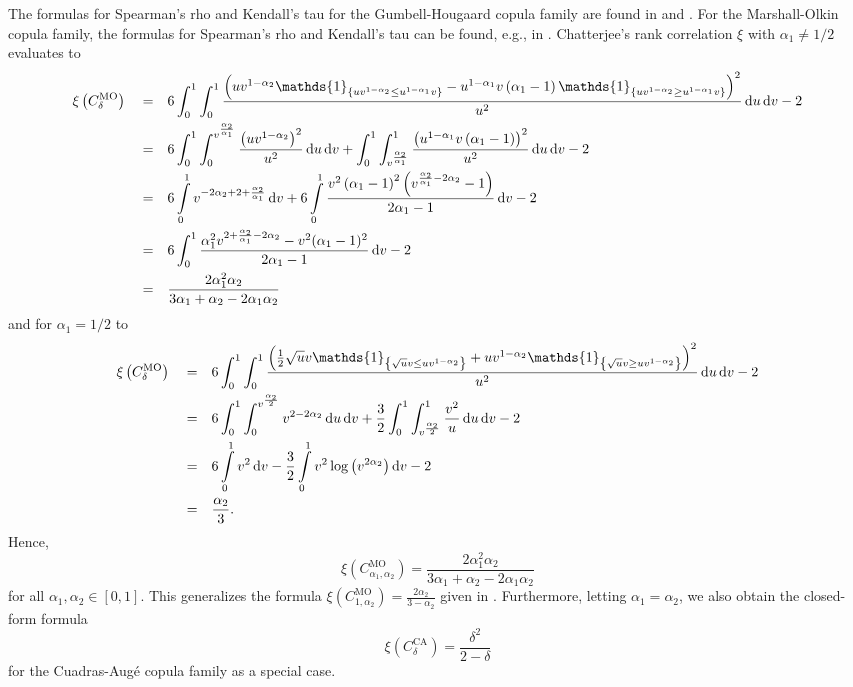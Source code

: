 \documentclass{article}
\def\1{\mathds{1}} %
\def\of#1{\left(#1\right)} %
\def\setof#1{\left\{#1\right\}} %
\newcommand{\de}{\mathrm{\,d}}
\begin{document}
The formulas for Spearman's rho and Kendall's tau for the Gumbell-Hougaard copula family are found in \cite[Example 4.2]{hurlimann2004properties} and \cite[Example 5.4]{Nelsen-2006}.
For the Marshall-Olkin copula family, the formulas for Spearman's rho and Kendall's tau can be found, e.g., in \cite[Example 5.7 a), Example 5.9 c)]{Nelsen-2006}.
Chatterjee's rank correlation $\xi$ with $\alpha_1 \neq 1/2$ evaluates to
\begin{align*}
    \xi\of{C^{\text{MO}}_{\delta}}
    \quad = \quad & 6 \int_0^1\int_0^1 \frac{\left(u v^{1 - \alpha_{2}} \1_{\setof{u v^{1 - \alpha_{2}} \leq u^{1 - \alpha_{1}} v}} - u^{1 - \alpha_{1}} v \left(\alpha_{1} - 1\right) \1_{\setof{u v^{1 - \alpha_{2}} \geq u^{1 - \alpha_{1}} v}}\right)^{2}}{u^{2}} \de u \de v - 2 \allowdisplaybreaks\\
    = \quad & 6\int_0^1\int_0^{v^{\frac{\alpha_2}{\alpha_1}}} \frac{\left(u v^{1 - \alpha_{2}}\right)^{2}}{u^{2}} \de u \de v
    + \int_0^1\int_{v^{\frac{\alpha_2}{\alpha_1}}}^1 \frac{\left(u^{1 - \alpha_{1}} v \left(\alpha_{1} - 1\right)\right)^{2}}{u^{2}} \de u \de v - 2 \allowdisplaybreaks\\
    = \quad & 6 \int\limits_{0}^{1}  v^{- 2 \alpha_{2} + 2 + \frac{\alpha_{2}}{\alpha_{1}}} \de v
    + 6 \int\limits_{0}^{1}\frac{v^2\left(\alpha_{1} - 1\right)^{2} \left(v^{\frac{\alpha_{2}}{\alpha_{1}}-2\alpha_{2}}-1 \right)}{2 \alpha_{1} - 1}
    \de v - 2 \\
    = \quad & 6 \int_0^1 \frac{\alpha_{1}^{2} v^{2+\frac{\alpha_{2}}{\alpha_{1}}- 2 \alpha_{2}} - v^2(\alpha_1-1)^2}{2 \alpha_{1} - 1}
    \de v - 2 \\
    = \quad & \frac{2 \alpha_{1}^{2} \alpha_{2}}{3 \alpha_{1} + \alpha_{2} - 2 \alpha_{1} \alpha_{2}}
\end{align*}
and for $\alpha_1=1/2$ to
\begin{align*}
    \xi\of{C^{\text{MO}}_{\delta}}
    \quad = \quad & 6 \int_0^1\int_0^1 \frac{\left(\frac12 \sqrt{u} v \1_{\setof{\sqrt{u} v \leq u v^{1 - \alpha_{2}}}} + u v^{1 - \alpha_{2}} \1_{\setof{\sqrt{u} v \geq u v^{1 - \alpha_{2}}}}\right)^{2}}{u^{2}} \de u \de v - 2 \\
    = \quad & 6\int_0^1\int_0^{v^{\frac{\alpha_2}{2}}} v^{2 - 2 \alpha_{2}} \de u \de v
    + \frac32\int_0^1\int_{v^{\frac{\alpha_2}{2}}}^1 \frac{v^{2}}{u} \de u \de v - 2 \allowdisplaybreaks\\
    = \quad & 6 \int\limits_{0}^{1}  v^2 \de v
    - \frac32 \int\limits_{0}^{1} v^{2} \log{\left(v^{2\alpha_{2}} \right)}
    \de v - 2 \\
    = \quad & \frac{\alpha_2}3
.\end{align*}
Hence,
\[
    \xi\of{C^{\text{MO}}_{\alpha_1, \alpha_2}} = \frac{2 \alpha_{1}^{2} \alpha_{2}}{3 \alpha_{1} + \alpha_{2} - 2 \alpha_{1} \alpha_{2}}
\] 
for all $\alpha_1,\alpha_2\in[0, 1]$.
This generalizes the formula $\xi\of{C^{\text{MO}}_{1, \alpha_2}} = \frac{2 \alpha_{2}}{3 - \alpha_{2}}$ given in \cite[Example 4]{fuchs2021quantifying}.
Furthermore, letting $\alpha_1=\alpha_2$, we also obtain the closed-form formula
\[
    \xi\of{C^{\text{CA}}_{\delta}} = \frac{\delta^2}{2-\delta}
\]
for the Cuadras-Augé copula family as a special case.
\end{document}
